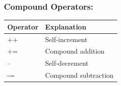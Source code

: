 \documentclass[
  letterpaper,
  DIV=11,
  numbers=noendperiod]{scrreprt}
\begin{document}
\hypertarget{compound-operators}{%
\subsubsection*{Compound Operators:}\label{compound-operators}}

\begin{longtable}[]{@{}ll@{}}
\toprule\noalign{}
Operator & Explanation \\
\midrule\noalign{}
\endhead
\bottomrule\noalign{}
\endlastfoot
++ & Self-increment \\
+= & Compound addition \\
-- & Self-decrement \\
-= & Compound subtraction \\
\end{longtable}
\end{document}

